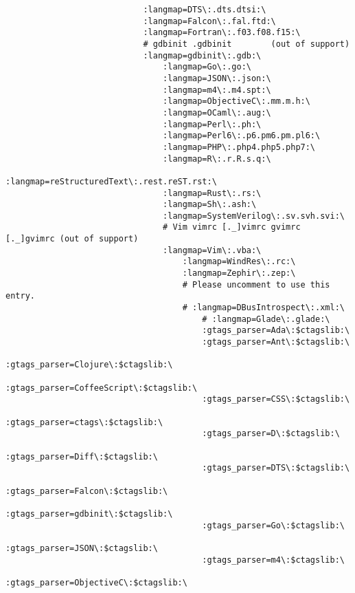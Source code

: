 \documentclass[11pt]{article}
\begin{document}
\begin{lstlisting}
                            :langmap=DTS\:.dts.dtsi:\
                            :langmap=Falcon\:.fal.ftd:\
                            :langmap=Fortran\:.f03.f08.f15:\
                            # gdbinit .gdbinit        (out of support)
                            :langmap=gdbinit\:.gdb:\
                                :langmap=Go\:.go:\
                                :langmap=JSON\:.json:\
                                :langmap=m4\:.m4.spt:\
                                :langmap=ObjectiveC\:.mm.m.h:\
                                :langmap=OCaml\:.aug:\
                                :langmap=Perl\:.ph:\
                                :langmap=Perl6\:.p6.pm6.pm.pl6:\
                                :langmap=PHP\:.php4.php5.php7:\
                                :langmap=R\:.r.R.s.q:\
                                :langmap=reStructuredText\:.rest.reST.rst:\
                                :langmap=Rust\:.rs:\
                                :langmap=Sh\:.ash:\
                                :langmap=SystemVerilog\:.sv.svh.svi:\
                                # Vim vimrc [._]vimrc gvimrc [._]gvimrc (out of support)
                                :langmap=Vim\:.vba:\
                                    :langmap=WindRes\:.rc:\
                                    :langmap=Zephir\:.zep:\
                                    # Please uncomment to use this entry.
                                    # :langmap=DBusIntrospect\:.xml:\
                                        # :langmap=Glade\:.glade:\
                                        :gtags_parser=Ada\:$ctagslib:\
                                        :gtags_parser=Ant\:$ctagslib:\
                                        :gtags_parser=Clojure\:$ctagslib:\
                                        :gtags_parser=CoffeeScript\:$ctagslib:\
                                        :gtags_parser=CSS\:$ctagslib:\
                                        :gtags_parser=ctags\:$ctagslib:\
                                        :gtags_parser=D\:$ctagslib:\
                                        :gtags_parser=Diff\:$ctagslib:\
                                        :gtags_parser=DTS\:$ctagslib:\
                                        :gtags_parser=Falcon\:$ctagslib:\
                                        :gtags_parser=gdbinit\:$ctagslib:\
                                        :gtags_parser=Go\:$ctagslib:\
                                        :gtags_parser=JSON\:$ctagslib:\
                                        :gtags_parser=m4\:$ctagslib:\
                                        :gtags_parser=ObjectiveC\:$ctagslib:\

\end{lstlisting}
\end{document}

